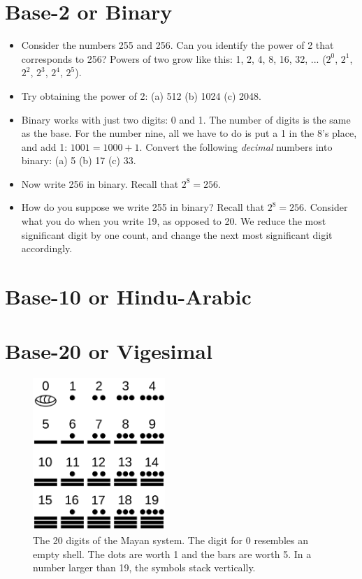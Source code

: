 \documentclass[12pt]{article}
\begin{document}
\section{Base-2 or Binary}

\begin{itemize}
\item Consider the numbers 255 and 256.  Can you identify the power of 2 that corresponds to 256?  Powers of two grow like this: 1, 2, 4, 8, 16, 32, ... ($2^0$, $2^1$, $2^2$, $2^3$, $2^4$, $2^5$). \\ \vspace{1cm}
\item Try obtaining the power of 2: (a) 512 (b) 1024 (c) 2048. \\ \vspace{1cm} 
\item Binary works with just two digits: 0 and 1.  The number of digits is the same as the base.  For the number nine, all we have to do is put a 1 in the 8's place, and add 1: $1001 = 1000 + 1$.  Convert the following \textit{decimal} numbers into binary: (a) 5 (b) 17 (c) 33. \\ \vspace{1.5cm}
\item Now write 256 in binary.  Recall that $2^8 = 256$. \\ \vspace{1cm}
\item How do you suppose we write 255 in binary?  Recall that $2^8 = 256$. Consider what you do when you write 19, as opposed to 20.  We reduce the most significant digit by one count, and change the next most significant digit accordingly. \\ \vspace{1.5cm}
\end{itemize}

\section{Base-10 or Hindu-Arabic}

\section{Base-20 or Vigesimal}

\begin{figure}[hb]
\centering
\includegraphics[width=5cm]{figures/maya_digits.png}
\caption{\label{fig:maya} The 20 digits of the Mayan system.  The digit for 0 resembles an empty shell.  The dots are worth 1 and the bars are worth 5.  In a number larger than 19, the symbols stack vertically.}
\end{figure}
\end{document}
